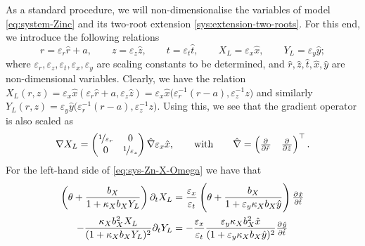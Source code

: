 \documentclass[11pt]{article}
\numberwithin{equation}{section}
\begin{document}
As a standard procedure,
we will non-dimensionalise the variables of model \eqref{eq:system-Zinc} and its two-root extension \eqref{sys:extension-two-roots}. For this end, we introduce the following relations
\[
    r = \varepsilon_r \hat{r} + a,
    \qquad
    z = \varepsilon_z \hat{z},
    \qquad
    t = \varepsilon_t \hat{t},
    \qquad
    X_L = \varepsilon_x \hat{x},
    \qquad
    Y_L = \varepsilon_y \hat{y};
\]
where \( \varepsilon_r, \varepsilon_z, \varepsilon_t, \varepsilon_x, \varepsilon_y\) are scaling constants to be determined, and \(\hat{r}, \hat z, \hat t, \hat x, \hat y\) are non-dimensional variables.
Clearly, we have the relation \(X_L(r,z) = \varepsilon_x \hat{x} (\varepsilon_r \hat r + a, \varepsilon_z \hat z) = \varepsilon_x \hat{x} \big( \varepsilon_r^{-1} (r-a) , \varepsilon_z^{-1} z\big) \) and similarly \(Y_L (r,z) = \varepsilon_y \hat{y} \big( \varepsilon_r^{-1} (r-a), \varepsilon_z^{-1} z \big)\). Using this, we see that the gradient operator is also scaled as
\[
    \nabla X_L =
    \begin{pmatrix}
        \nicefrac{1}{\varepsilon_r} & 0 \\
        0 & \nicefrac{1}{\varepsilon_z}
    \end{pmatrix}
    \hat{\nabla} \varepsilon_x \hat{x},
    \qquad \text{with} \qquad
    \hat{\nabla} = 
    \begin{pmatrix}
        \pd{ }{\hat r}
        &
        \pd{ }{\hat z}
    \end{pmatrix}^\top .
\]
For the left-hand side of \eqref{eq:sys-Zn-X-Omega} we have that
\begin{align}
    \left( \theta + \frac{b_X}{1 + \kappa_X b_X Y_L} \right) \partial_t X_L &= \frac{\varepsilon_x}{\varepsilon_t} \left( \theta + \frac{b_X}{1 + \varepsilon_y \kappa_X b_X \hat{y}} \right)  \pd{\hat{x}}{\hat{t}}
    \\
    - \frac{\kappa_X b_X^2 X_L}{(1+\kappa_X b_X Y_L)^2} \partial_t Y_L &=
    -\frac{\varepsilon_x}{\varepsilon_t} \frac{\varepsilon_y \kappa_X b_X^2 \hat{x}}{(1+ \varepsilon_y\kappa_X b_X \hat{y})^2} \pd{\hat y}{\hat t}
\end{align}
\end{document}
